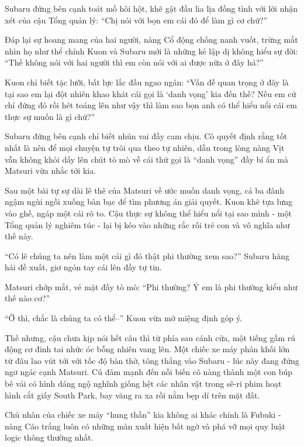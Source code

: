 \documentclass[../main.tex]{subfiles}
\begin{document}
Subaru đứng bên cạnh toát mồ hôi hột, khẽ gật đầu lia lịa đồng tình với lời nhận xét của cậu Tổng quản lý: ``Chị nói với bọn em cái đó để làm gì cơ chứ?''

Đáp lại sự hoang mang của hai người, nàng Cổ động chống nanh vuốt, trừng mắt nhìn họ như thể chính Kuon và Subaru mới là những kẻ lập dị không hiểu sự đời: ``Thế không nói với hai người thì em còn nói với ai được nữa ở đây hả?''

Kuon chỉ biết tặc lưỡi, bất lực lắc đầu ngao ngán: ``Vấn đề quan trọng ở đây là tại sao em lại đột nhiên khao khát cái gọi là `danh vọng' kia đến thế? Nếu em cứ chỉ đứng đó rồi hét toáng lên như vậy thì làm sao bọn anh có thể hiểu nổi cái em thực sự muốn là gì chứ?''

Subaru đứng bên cạnh chỉ biết nhún vai đầy cam chịu. Cô quyết định rằng tốt nhất là nên để mọi chuyện tự trôi qua theo tự nhiên, dẫu trong lòng nàng Vịt vẫn không khỏi dấy lên chút tò mò về cái thứ gọi là ``danh vọng'' đầy bí ẩn mà Matsuri vừa nhắc tới kia.

\ct

Sau một bài tự sự dài lê thê của Matsuri về ước muốn danh vọng, cả ba đành ngậm ngùi ngồi xuống bàn bạc để tìm phương án giải quyết. Kuon khẽ tựa lưng vào ghế, ngáp một cái rõ to. Cậu thực sự không thể hiểu nổi tại sao mình - một Tổng quản lý nghiêm túc - lại bị kéo vào những rắc rối trẻ con và vô nghĩa như thế này.

``Có lẽ chúng ta nên làm một cái gì đó thật phi thường xem sao?'' Subaru hăng hái đề xuất, giơ ngón tay cái lên đầy tự tin.

Matsuri chớp mắt, vẻ mặt đầy tò mò: ``Phi thường? Ý em là phi thường kiểu như thế nào cơ?''

``Ờ thì, chắc là chúng ta có thể--'' Kuon vừa mở miệng định góp ý.

Thế nhưng, cậu chưa kịp nói hết câu thì từ phía sau cánh cửa, một tiếng gầm rú động cơ đinh tai nhức óc bỗng nhiên vang lên. Một chiếc xe máy phân khối lớn từ đâu lao vút tới với tốc độ bàn thờ, tông thẳng vào Subaru - lúc này đang đứng ngơ ngác cạnh Matsuri. Cú đâm mạnh đến nỗi biến cô nàng thành một con búp bê vải có hình dáng ngộ nghĩnh giống hệt các nhân vật trong sê-ri phim hoạt hình cắt giấy South Park, bay văng ra xa rồi nằm bẹp dí trên mặt đất.


Chủ nhân của chiếc xe máy ``hung thần'' kia không ai khác chính là Fubuki - nàng Cáo trắng luôn có những màn xuất hiện bất ngờ và phá vỡ mọi quy luật logic thông thường nhất.
\end{document}
